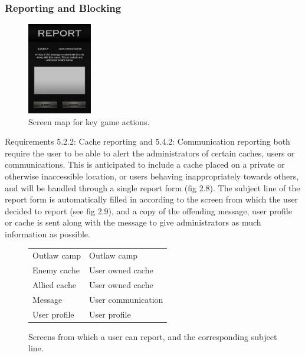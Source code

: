 \subsubsection{Reporting and Blocking}
\begin{figure}
	\vspace{-20pt}
	\begin{center}
	\includegraphics[width=0.25\textwidth]{images/report_mockup}
	\caption{Screen map for key game actions.}
	\label{report_mockup}
	\end{center}
	\vspace{-130pt}
\end{figure}

Requirements 5.2.2: Cache reporting and 5.4.2: Communication reporting both require the user to be able to alert the administrators of certain caches, users or communications. This is anticipated to include a cache placed on a private or otherwise inaccessible location, or users behaving inappropriately towards others, and will be handled through a single report form (fig 2.8). The subject line of the report form is automatically filled in according to the screen from which the user decided to report (see fig 2.9), and a copy of the offending message, user profile or cache is sent along with the message to give administrators as much information as possible.

\begin{centering}
\begin{figure}[ht]
	\begin{minipage}{0.5\textwidth}
	\begin{tabularx}{\textwidth}{| X | X |}
		\hline
		Outlaw camp & Outlaw camp \\
		Enemy cache & User owned cache \\
		Allied cache & User owned cache \\
		Message & User communication \\
		User profile & User profile \\
		\hline
	\end{tabularx}
	\caption{Screens from which a user can report,
	and the corresponding subject line.}
	\label{report_table}
	\end{minipage}
\end{figure}
\end{centering}


